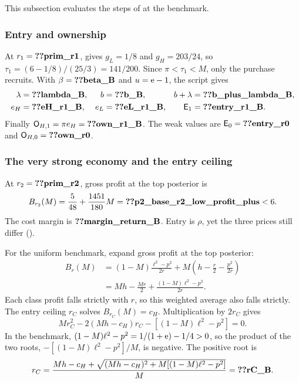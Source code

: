 This subsection evaluates the steps of  at the benchmark.

\subsubsection{Entry and ownership}\label{sec:benchmark-entry}
At $r_1=\reg{prim_r1}$,  gives $g_L=1/8$ and $g_H=203/24$, so
$\tau_1=(6-1/8)/(25/3)=141/200$.
Since $\pi<\tau_1<M$, only the purchase recruits.
With $\beta=\reg{beta_B}$ and $u=\mathrm{e}-1$, the script gives
\begin{align*}
\lambda&=\reg{lambda_B},& b&=\reg{b_B},& b+\lambda&=\reg{b_plus_lambda_B},\\
e_H&=\reg{eH_r1_B},& e_L&=\reg{eL_r1_B},& \Ent_1&=\reg{entry_r1_B}.
\end{align*}
Finally $\Own_{H,1}=\pi e_H=\reg{own_r1_B}$.
The weak values are $\Ent_0=\reg{entry_r0}$ and $\Own_{H,0}=\reg{own_r0}$.

\subsubsection{The very strong economy and the entry ceiling}\label{sec:benchmark-ceiling}
At $r_2=\reg{prim_r2}$, gross profit at the top posterior is
\[
B_{r_2}(M)=\frac5{48}+\frac{1451}{180}M
=\reg{p2_base_r2_low_profit_plus}<6.
\]
The cost margin is $\reg{margin_return_B}$.
Entry is $\rho$, yet the three prices still differ ().

For the uniform benchmark, expand gross profit at the top posterior:
\begin{align*}
B_r(M)
&=(1-M)\frac{\ell^2-p^2}{2r}
  +M\left(h-\frac r2-\frac{p^2}{2r}\right)\\
&=Mh-\frac{Mr}{2}+\frac{(1-M)\ell^2-p^2}{2r}.
\end{align*}
Each class profit falls strictly with $r$, so this weighted average also falls strictly.
The entry ceiling $r_C$ solves $B_{r_C}(M)=c_H$.
Multiplication by $2r_C$ gives
\[
Mr_C^2-2(Mh-c_H)r_C-[(1-M)\ell^2-p^2]=0.
\]
In the benchmark, $(1-M)\ell^2-p^2=1/(1+\mathrm{e})-1/4>0$, so the product of the two roots, $-[(1-M)\ell^2-p^2]/M$, is negative.
The positive root is
\[
r_C=\frac{Mh-c_H+\sqrt{(Mh-c_H)^2+M[(1-M)\ell^2-p^2]}}{M}
=\reg{rC_B}.
\]

